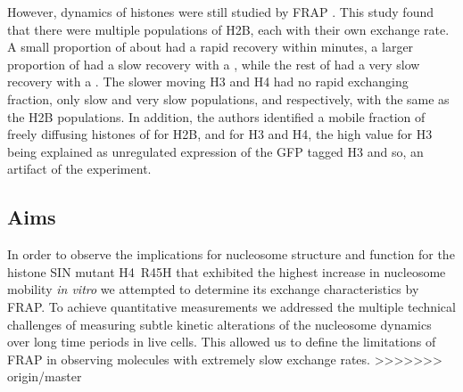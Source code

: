 
    However, dynamics of histones were still studied by FRAP
    \citep{KimuraCook}.  This study found that there were multiple
    populations of H2B, each with their own exchange rate.  A small
    proportion of about  had a rapid recovery within minutes,
    a larger proportion of  had a slow recovery with a
    , while the rest of 
    had a very slow recovery with a \halflife[$>$\SI{510}{\minute}].  The
    slower moving H3 and H4 had no rapid exchanging fraction, only
    slow and very slow populations,  and 
    respectively, with the same \halflife[] as the H2B populations.
    In addition, the authors identified a mobile fraction of freely
    diffusing histones of  for H2B, and  for H3 and
    H4, the high value for H3 being explained as unregulated
    expression of the GFP tagged H3 and so, an artifact of the
    experiment.

  \subsection{Aims}

    In order to observe the implications for nucleosome structure and function for
    the histone SIN mutant H4~R45H that exhibited the
    highest increase in nucleosome mobility \textit{in vitro}
    we attempted to determine its exchange characteristics by FRAP.
    To achieve quantitative measurements we addressed the multiple technical challenges 
    of measuring subtle kinetic alterations of the nucleosome dynamics 
    over long time periods in live cells. This allowed us to define 
    the limitations of FRAP in observing molecules with extremely slow exchange rates.
>>>>>>> origin/master

